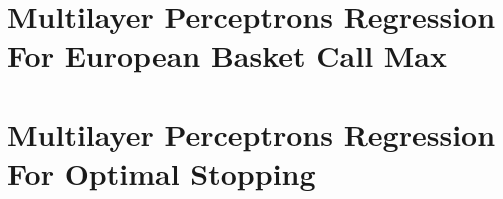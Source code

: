 \section{Multilayer Perceptrons Regression For European Basket Call Max}

\parencite{FergusonRyan2018}


\section{Multilayer Perceptrons Regression For Optimal Stopping}

